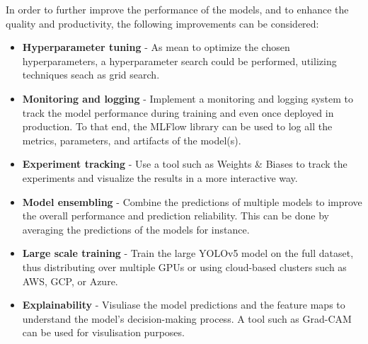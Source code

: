 \documentclass{article}
\begin{document}
In order to further improve the performance of the models, and to enhance the quality and productivity, the following improvements can be considered:

\begin{itemize}
    \item \textbf{Hyperparameter tuning} - As mean to optimize the chosen hyperparameters, a hyperparameter search could be performed, utilizing techniques seach as grid search.
    \item \textbf{Monitoring and logging} - Implement a monitoring and logging system to track the model performance during training and even once deployed in production. To that end, the MLFlow library can be used to log all the metrics, parameters, and artifacts of the model(s).
    \item \textbf{Experiment tracking} - Use a tool such as Weights \& Biases to track the experiments and visualize the results in a more interactive way.
    \item \textbf{Model ensembling} - Combine the predictions of multiple models to improve the overall performance and prediction reliability. This can be done by averaging the predictions of the models for instance.
    \item \textbf{Large scale training} - Train the large YOLOv5 model on the full dataset, thus distributing over multiple GPUs or using cloud-based clusters such as AWS, GCP, or Azure.
    \item \textbf{Explainability} - Visuliase the model predictions and the feature maps to understand the model's decision-making process. A tool such as Grad-CAM can be used for visulisation purposes.
\end{itemize}
\end{document}
